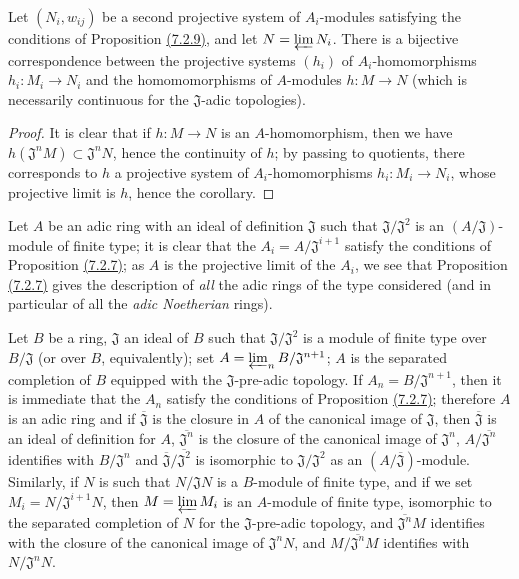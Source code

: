\begin{cor}[7.2.10]
\label{cor-0.7.2.10}
Let $(N_i,w_{ij})$ be a second projective system of $A_i$-modules satisfying the conditions
of Proposition \hyperref[prop-0.7.2.9]{(7.2.9)}, and let $N=\varprojlim N_i$. There is a
bijective correspondence between the projective systems $(h_i)$ of $A_i$-homomorphisms
$h_i:M_i\to N_i$ and the homomomorphisms of $A$-modules $h:M\to N$ (which is necessarily
continuous for the $\mathfrak{J}$-adic topologies).
\end{cor}

\begin{proof}
\label{proof-cor-0.7.2.10}
It is clear that if $h:M\to N$ is an $A$-homomorphism, then we have
$h(\mathfrak{J}^n M)\subset\mathfrak{J}^n N$, hence the continuity of $h$; by passing to
quotients, there corresponds to $h$ a projective system of $A_i$-homomorphisms
$h_i:M_i\to N_i$, whose projective limit is $h$, hence the corollary.
\end{proof}

\begin{rmk}[7.2.11]
\label{rmk-0.7.2.11}
Let $A$ be an adic ring with an ideal of definition $\mathfrak{J}$ such that
$\mathfrak{J}/\mathfrak{J}^2$ is an $(A/\mathfrak{J})$-module of finite type; it is clear
that the $A_i=A/\mathfrak{J}^{i+1}$ satisfy
the conditions of Proposition \hyperref[prop-0.7.2.7]{(7.2.7)}; as $A$ is the projective
limit of the $A_i$, we see that Proposition \hyperref[prop-0.7.2.7]{(7.2.7)} gives the
description of {\em all} the adic rings of the type considered (and in particular of all
the {\em adic Noetherian} rings).
\end{rmk}

\begin{exm}[7.2.12]
\label{exm-0.7.2.12}
Let $B$ be a ring, $\mathfrak{J}$ an ideal of $B$ such that $\mathfrak{J}/\mathfrak{J}^2$ is
a module of finite type over $B/\mathfrak{J}$ (or over $B$, equivalently); set
$A=\varprojlim_n B/\mathfrak{J}^{n+1}$; $A$ is the separated completion of $B$ equipped with
the $\mathfrak{J}$-pre-adic topology. If $A_n=B/\mathfrak{J}^{n+1}$, then it is immediate
that the $A_n$ satisfy the conditions of Proposition \hyperref[prop-0.7.2.7]{(7.2.7)};
therefore $A$ is an adic ring and if $\overline{\mathfrak{J}}$ is the closure in $A$ of the
canonical image of $\mathfrak{J}$, then $\overline{\mathfrak{J}}$ is an ideal of definition
for $A$, $\overline{\mathfrak{J}^n}$ is the closure of the canonical image of
$\mathfrak{J}^n$, $A/\overline{\mathfrak{J}^n}$ identifies with $B/\mathfrak{J}^n$ and
$\overline{\mathfrak{J}}/\overline{\mathfrak{J}^2}$ is isomorphic to
$\mathfrak{J}/\mathfrak{J}^2$ as an $(A/\overline{\mathfrak{J}})$-module. Similarly, if $N$
is such that $N/\mathfrak{J}N$ is a $B$-module of finite type, and if we set
$M_i=N/\mathfrak{J}^{i+1}N$, then $M=\varprojlim M_i$ is an $A$-module of finite type,
isomorphic to the separated completion of $N$ for the $\mathfrak{J}$-pre-adic topology, and
$\overline{\mathfrak{J}^n}M$ identifies with the closure of the canonical image of
$\mathfrak{J}^n N$, and $M/\overline{\mathfrak{J}^n}M$ identifies with
$N/\mathfrak{J}^n N$.
\end{exm}

